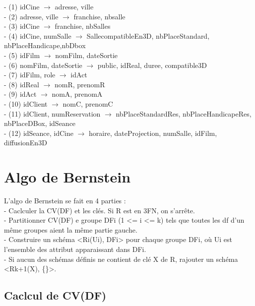 \documentclass[a4paper,sffamily,12pt]{article}
\begin{document}
		\vspace{0.5cm}
	
		\noindent- (1) idCine $\rightarrow$ adresse, ville \\
		- (2) adresse, ville $\rightarrow$ franchise, nbsalle \\
		- (3) idCine $\rightarrow$ franchise, nbSalles \\
		- (4) idCine, numSalle $\rightarrow$ SallecompatibleEn3D, nbPlaceStandard, nbPlaceHandicape,nbDbox \\
 		- (5) idFilm $\rightarrow$ nomFilm, dateSortie \\
		- (6) nomFilm, dateSortie $\rightarrow$ public, idReal, duree, compatible3D \\
		- (7) idFilm, role $\rightarrow$  idAct \\
		- (8) idReal $\rightarrow$ nomR, prenomR \\
		- (9) idAct $\rightarrow$ nomA, prenomA \\
		- (10) idClient $\rightarrow$ nomC, prenomC \\
		- (11) idClient, numReservation $\rightarrow$ nbPlaceStandardRes, nbPlaceHandicapeRes, nbPlaceDBox, idSeance \\
		- (12) idSeance, idCine $\rightarrow$ horaire, dateProjection, numSalle, idFilm, diffusionEn3D \\
		
	\section{Algo de Bernstein}
	
		\vspace{0.5cm}

		\noindent L'algo de Bernstein se fait en 4 parties : \\
			- Caclculer la CV(DF) et les clés. Si R est en 3FN, on s'arrête. \\
			- Partitionner CV(DF) e groupe DFi (1 <= i <= k) tels que toutes les df d'un même groupes aient la même partie gauche. \\
			- Construire un schéma <Ri(Ui), DFi> pour chaque groupe DFi, où Ui est l'ensemble des attribut apparaissant dans DFi. \\
			- Si aucun des schémas définis ne contient de clé X de R, rajouter un schéma <Rk+1(X), \{\}>. \\	

		\subsection{Caclcul de CV(DF)}
\end{document}
